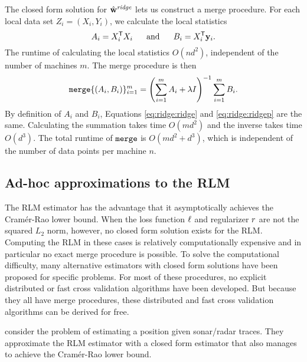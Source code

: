\documentclass[thesis.tex]{subfiles}
\newcommand{\merge}{\mkprocedure{merge}}
\newcommand{\wridge}{\hat\w^\textit{ridge}}
\newcommand{\wridgep}{\hat\w^\textit{ridge,par}}
\begin{document}
The closed form solution for $\wridge$ lets us construct a merge procedure.
For each local data set $Z_i=(X_i, Y_i)$, we calculate the local statistics
\begin{equation}
    A_i = {X}^{\mathsf{T}}_i X_i
    ~~~~~\text{and}~~~~~
    B_i = {X}^{\mathsf{T}}_i \mathbf{y}_i
    .
\end{equation}
The runtime of calculating the local statistics $O(nd^2)$, independent of the number of machines $m$.
The merge procedure is then
\begin{equation}
    \label{eq:ridge:ridgep}
    \merge\{(A_i,B_i)\}_{i=1}^m
    = \left(\sum_{i=1}^m A_i + \lambda I\right)^{-1} \sum_{i=1}^m B_i
    .
\end{equation}
By definition of $A_i$ and $B_i$,
Equations \eqref{eq:ridge:ridge} and \eqref{eq:ridge:ridgep} are the same.
Calculating the summation takes time $O(md^2)$ and the inverse takes time $O(d^3)$.
The total runtime of $\merge$ is $O(md^2+d^3)$,
which is independent of the number of data points per machine $n$.


\subsection{Ad-hoc approximations to the RLM}

The RLM estimator has the advantage that it asymptotically achieves the Cram\'er-Rao lower bound.
When the loss function $\ell$ and regularizer $r$ are not the squared $L_2$ norm,
however, no closed form solution exists for the RLM.
Computing the RLM in these cases is relatively computationally expensive and in particular no exact merge procedure is possible.
To solve the computational difficulty, 
many alternative estimators with closed form solutions have been proposed for specific problems.
For most of these procedures, no explicit distributed or fast cross validation algorithms have been developed.
But because they all have merge procedures,
these distributed and fast cross validation algorithms can be derived for free.

\citet{chan1994simple} consider the problem of estimating a position given sonar/radar traces.
They approximate the RLM estimator with a closed form estimator that also manages to achieve the Cram\'er-Rao lower bound.
\end{document}
